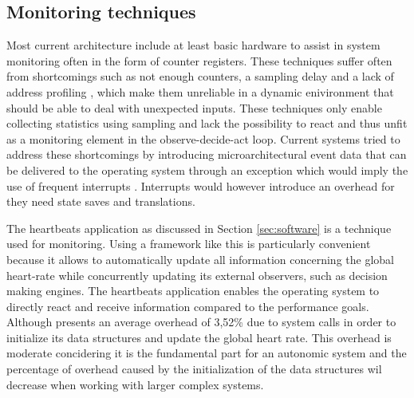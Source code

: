 \subsection{Monitoring techniques}
\label{sec:selfawareness}
Most current architecture include at least basic hardware to assist in system monitoring often in the form of counter registers. These techniques suffer often from shortcomings such as not enough counters, a sampling delay and a lack of address profiling \cite{reconfigurable}, which make them unreliable in a dynamic enivironment that should be able to deal with unexpected inputs. These techniques only enable collecting statistics using sampling and lack the possibility to react and thus unfit as a monitoring element in the observe-decide-act loop. Current systems tried to address these shortcomings by introducing microarchitectural event data that can be delivered to the operating system through an exception which would imply the use of frequent interrupts \cite{reconfigurable}. Interrupts would however introduce an overhead for they need state saves and translations. 

The heartbeats application as discussed in Section \ref{sec:software} is a technique used for monitoring. Using a framework like this is particularly convenient because it allows to automatically update all information concerning the global heart-rate while concurrently updating its external observers, such as decision making engines. The heartbeats application enables the operating system to directly react and receive information compared to the performance goals. Although \cite{selfaware} presents an average overhead of 3,52\% due to system calls in order to initialize its data structures and update the global heart rate. This overhead is moderate concidering it is the fundamental part for an autonomic system and the percentage of overhead caused by the initialization of the data structures wil decrease when working with larger complex systems. 